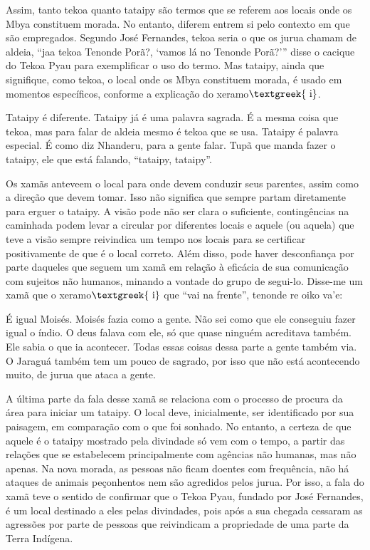 \documentclass{article}
\begin{document}
Assim, tanto tekoa quanto tataipy s\~ao termos que se referem aos locais
onde os Mbya constituem morada. No entanto, diferem entrem si pelo
contexto em que s\~ao empregados. Segundo Jos\'e Fernandes, tekoa seria
o que os jurua chamam de aldeia, {\textquotedblleft}jaa tekoa Tenonde
Por\~a?, {\textquoteleft}vamos l\'a no Tenonde
Por\~a?{\textquoteright}{\textquotedblright} disse o cacique do Tekoa
Pyau para exemplificar o uso do termo. Mas tataipy, ainda que
signifique, como tekoa, o local onde os Mbya constituem morada, \'e
usado em momentos espec\'ificos, conforme a explica\c{c}\~ao do
xeramo$\text{\textgreek{~i}}$. 

Tataipy \'e diferente. Tataipy j\'a \'e uma palavra sagrada. \'E a mesma
coisa que tekoa, mas para falar de aldeia mesmo \'e tekoa que se usa.
Tataipy \'e palavra especial. \'E como diz Nhanderu, para a gente
falar. Tup\~a que manda fazer o tataipy, ele que est\'a falando,
{\textquotedblleft}tataipy, tataipy{\textquotedblright}.

Os xam\~as anteveem o local para onde devem conduzir seus parentes,
assim como a dire\c{c}\~ao que devem tomar. Isso n\~ao significa que
sempre partam diretamente para erguer o tataipy. A vis\~ao pode n\~ao
ser clara o suficiente, conting\^encias na caminhada podem levar a
circular por diferentes locais e aquele (ou aquela) que teve a vis\~ao
sempre reivindica um tempo nos locais para se certificar positivamente
de que \'e o local correto. Al\'em disso, pode haver desconfian\c{c}a
por parte daqueles que seguem um xam\~a em rela\c{c}\~ao \`a efic\'acia
de sua comunica\c{c}\~ao com sujeitos n\~ao humanos, minando a vontade
do grupo de segui-lo. Disse-me um xam\~a que o
xeramo$\text{\textgreek{~i}}$ que {\textquotedblleft}vai na
frente{\textquotedblright}, tenonde re oiko va{\textquoteright}e:

\'E igual Mois\'es. Mois\'es fazia como a gente. N\~ao sei como que ele
conseguiu fazer igual o \'indio. O deus falava com ele, s\'o que quase
ningu\'em acreditava tamb\'em. Ele sabia o que ia acontecer. Todas
essas coisas dessa parte a gente tamb\'em via. O Jaragu\'a tamb\'em tem
um pouco de sagrado, por isso que n\~ao est\'a acontecendo muito, de
jurua que ataca a gente.

A \'ultima parte da fala desse xam\~a se relaciona com o processo de
procura da \'area para iniciar um tataipy. O local deve, inicialmente,
ser identificado por sua paisagem, em compara\c{c}\~ao com o que foi
sonhado. No entanto, a certeza de que aquele \'e o tataipy mostrado
pela divindade s\'o vem com o tempo, a partir das rela\c{c}\~oes que se
estabelecem principalmente com ag\^encias n\~ao humanas, mas n\~ao
apenas. Na nova morada, as pessoas n\~ao ficam doentes com
frequ\^encia, n\~ao h\'a ataques de animais pe\c{c}onhentos nem s\~ao
agredidos pelos jurua. Por isso, a fala do xam\~a teve o sentido de
confirmar que o Tekoa Pyau, fundado por Jos\'e Fernandes, \'e um local
destinado a eles pelas divindades, pois ap\'os a sua chegada cessaram
as agress\~oes por parte de pessoas que reivindicam a propriedade de
uma parte da Terra Ind\'igena.
\end{document}
